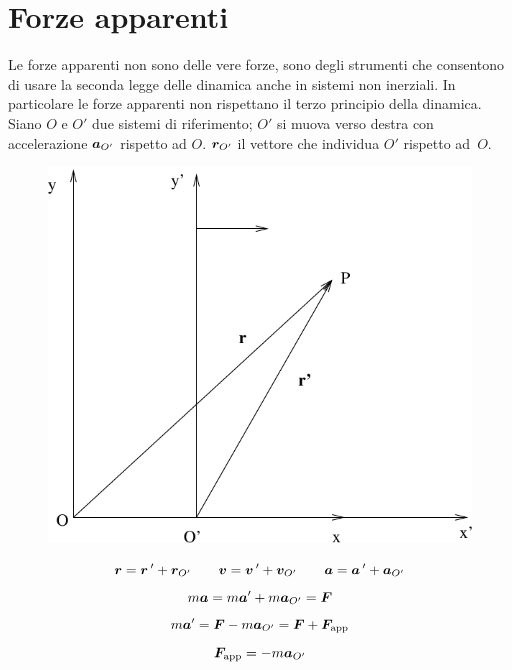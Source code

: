 \section{Forze apparenti}
Le forze apparenti non sono delle vere forze, sono degli strumenti che consentono di usare la seconda legge delle dinamica anche in sistemi non inerziali. In particolare le forze apparenti non rispettano il terzo principio della dinamica. Siano $O$ e $O'$ due sistemi di riferimento; $O'$ si muova verso destra con accelerazione $\boldsymbol{a}_{O'}$ rispetto ad $O$. $\boldsymbol{r}_{O'}$ il vettore che individua $O'$ rispetto \mbox{ad $O$.}
\begin{figure}[htbp]
   \centering
   \includegraphics[scale=0.5]{immagini/fisica1/apparenti}
\end{figure}
\begin{equation*}\boldsymbol{r}={\boldsymbol{r}}\,^\prime+\boldsymbol{r}_{O'}\qquad\boldsymbol{v}=\boldsymbol{v}\,'+\boldsymbol{v}_{O'}\qquad\boldsymbol{a}=\boldsymbol{a}\,'+\boldsymbol{a}_{O'}\end{equation*}
\begin{equation*}m\boldsymbol{a}=m\boldsymbol{a}'+m\boldsymbol{a}_{O'}=\boldsymbol{F}\end{equation*}
\begin{equation*}m\boldsymbol{a}'=\boldsymbol{F}-m\boldsymbol{a}_{O'}=\boldsymbol{F}+\boldsymbol{F}_\text{app}\end{equation*}
\begin{equation*}\boldsymbol{F}_\text{app}=-m\boldsymbol{a}_{O'}\end{equation*}
